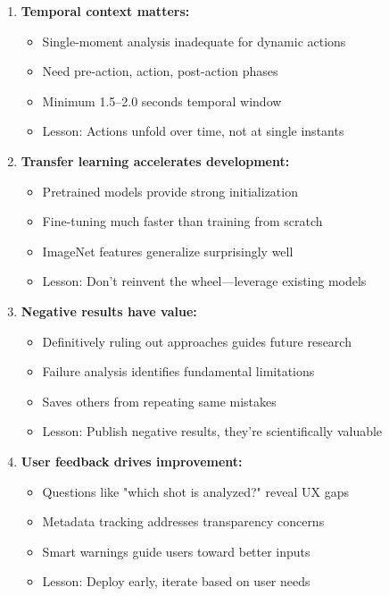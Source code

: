 \documentclass[11pt,a4paper]{article}
\begin{document}
\begin{enumerate}
\item \textbf{Temporal context matters:}
   \begin{itemize}
   \item Single-moment analysis inadequate for dynamic actions
   \item Need pre-action, action, post-action phases
   \item Minimum 1.5--2.0 seconds temporal window
   \item Lesson: Actions unfold over time, not at single instants
   \end{itemize}

\item \textbf{Transfer learning accelerates development:}
   \begin{itemize}
   \item Pretrained models provide strong initialization
   \item Fine-tuning much faster than training from scratch
   \item ImageNet features generalize surprisingly well
   \item Lesson: Don't reinvent the wheel---leverage existing models
   \end{itemize}

\item \textbf{Negative results have value:}
   \begin{itemize}
   \item Definitively ruling out approaches guides future research
   \item Failure analysis identifies fundamental limitations
   \item Saves others from repeating same mistakes
   \item Lesson: Publish negative results, they're scientifically valuable
   \end{itemize}

\item \textbf{User feedback drives improvement:}
   \begin{itemize}
   \item Questions like "which shot is analyzed?" reveal UX gaps
   \item Metadata tracking addresses transparency concerns
   \item Smart warnings guide users toward better inputs
   \item Lesson: Deploy early, iterate based on user needs
   \end{itemize}
\end{enumerate}
\end{document}
